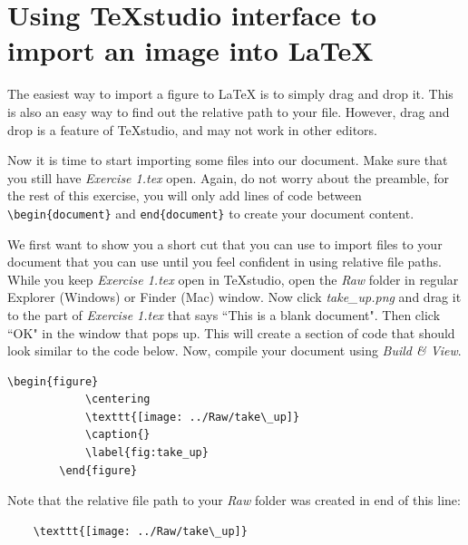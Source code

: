 \documentclass[12pts]{article}
\begin{document}
	\section{Using TeXstudio interface to import an image into \LaTeX}
	
	\begin{tcolorbox}[colback=white,colframe=orange,title=\textbf{Read first}]
		The easiest way to import a figure to {\LaTeX} is to simply drag and drop it. This is also an easy way to find out the relative path to your file. However, drag and drop is a feature of TeXstudio, and may not work in other editors.
	\end{tcolorbox}

	Now it is time to start importing some files into our document. Make sure that you still have \emph{Exercise 1.tex} open. Again, do not worry about the preamble, for the rest of this exercise, you will only add lines of code between \verb|\begin{document}| and \verb|end{document}| to create your document content.
	
	We first want to show you a short cut that you can use to import files to your document that you can use until you feel confident in using relative file paths. While you keep \emph{Exercise 1.tex} open in TeXstudio, open the \emph{Raw} folder in regular Explorer (Windows) or Finder (Mac) window. Now click \emph{take\_up.png} and drag it to the part of \emph{Exercise 1.tex} that says ``This is a blank document". Then click ``OK" in the window that pops up. This will create a section of code that should look similar to the code below. Now, compile your document using \emph{Build \& View}.
	
	\begin{center}
		\begin{Verbatim}[commandchars=+\(\)]
		\begin{figure}
			\centering
			\texttt{[image: ../Raw/take\_up]}
			\caption{}
			\label{fig:take_up}
		\end{figure}
		\end{Verbatim}
	\end{center}
	
	Note that the relative file path to your \emph{Raw} folder was created in end of this line:
	
	\begin{Verbatim}
	\texttt{[image: ../Raw/take\_up]}
	\end{Verbatim}
	
\end{document}
